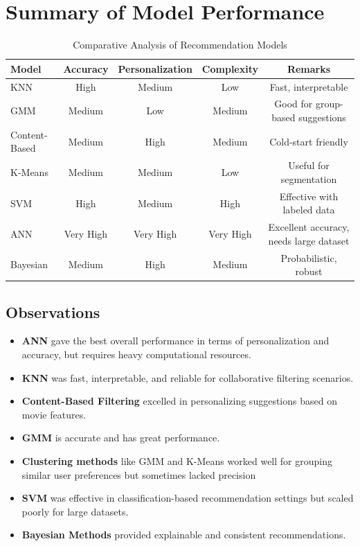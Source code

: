 \documentclass[a4paper]{article}
\theoremstyle{plain}
\begin{document}
\section{Summary of Model Performance}
\begin{table}[H]
    \centering
    \begin{tabular}{|l|c|c|c|c|}
        \hline
        \textbf{Model} & \textbf{Accuracy} & \textbf{Personalization} & \textbf{Complexity} & \textbf{Remarks} \\
        \hline
        KNN & High & Medium & Low & Fast, interpretable \\
        GMM & Medium & Low & Medium & Good for group-based suggestions \\
        Content-Based & Medium & High & Medium & Cold-start friendly \\
        K-Means & Medium & Medium & Low & Useful for segmentation \\
        SVM & High & Medium & High & Effective with labeled data \\
        ANN & Very High & Very High & Very High & Excellent accuracy, needs large dataset \\
        Bayesian & Medium & High & Medium & Probabilistic, robust \\
        \hline
    \end{tabular}
    \caption{Comparative Analysis of Recommendation Models}
    \label{tab:comparison}
\end{table}

\subsection{Observations}
\begin{itemize}
    \item \textbf{ANN} gave the best overall performance in terms of personalization and accuracy, but requires heavy computational resources.
    \item \textbf{KNN} was fast, interpretable, and reliable for collaborative filtering scenarios.
    \item \textbf{Content-Based Filtering} excelled in personalizing suggestions based on movie features.
    \item \textbf{GMM} is accurate and has great performance.
    \item \textbf{Clustering methods} like GMM and K-Means worked well for grouping similar user preferences but sometimes lacked precision 
    \item \textbf{SVM} was effective in classification-based recommendation settings but scaled poorly for large datasets.
    \item \textbf{Bayesian Methods} provided explainable and consistent recommendations.
\end{itemize}
\end{document}
